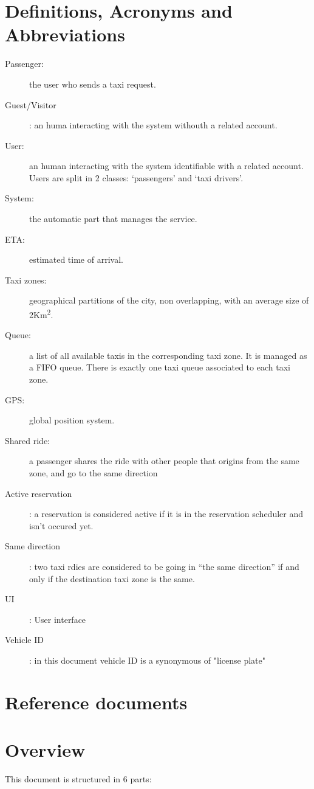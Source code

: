 \section{Definitions, Acronyms and Abbreviations}
\begin{description}
  \item[Passenger:] the user who sends a taxi request.
  \item[Guest/Visitor]: an huma interacting with the system withouth a related account.
  \item[User:] an human interacting with the system identifiable with a related account. Users are split in 2 classes: `passengers' and `taxi drivers'.
  \item[System:] the automatic part that manages the service.
  \item[ETA:] estimated time of arrival.
  \item[Taxi zones:] geographical partitions of the city, non overlapping, with an average size of 2Km\textsuperscript{2}.
  \item[Queue:] a list of all available taxis in the corresponding taxi zone. It is managed as a FIFO queue.
    There is exactly one taxi queue associated to each taxi zone.
  \item[GPS:] global position system.
  \item[Shared ride:] a passenger shares the ride with other people that origins from the same zone, and go to the same direction
  \item[Active reservation]: a reservation is considered active if it is in the reservation scheduler and isn't occured yet.
  \item[Same direction]: two taxi rdies are considered to be going in ``the same direction'' if and only if the destination taxi zone is the same.
  \item [UI]: User interface
  \item[Vehicle ID] : in this document vehicle ID is a synonymous of "license plate"
\end{description}


\section{Reference documents}


\section{Overview}

This document is structured in 6 parts:

